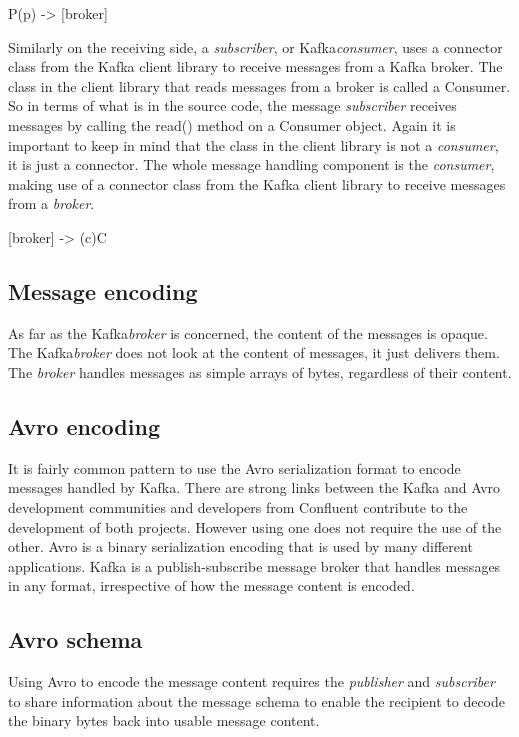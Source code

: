 \documentclass{article}
\newcommand{\avro} {Avro\xspace}
\newcommand{\kafka} {Kafka\xspace}
\newcommand{\kfbroker} {\textit{broker}\xspace}
\newcommand{\kfconsumer} {\textit{consumer}\xspace}
\newcommand{\kfpublisher} {\textit{publisher}\xspace}
\newcommand{\kfsubscriber} {\textit{subscriber}\xspace}
\newcommand{\confluent} {Confluent\xspace}
\newcommand{\javaname}[1] {{\ttfamily\color{codeblue} #1}}
\begin{document}
   {P(p)} -> [broker]

Similarly on the receiving side, a \kfsubscriber, or \kafka \kfconsumer, uses a connector class from the \kafka client library to receive messages from a \kafka broker.
The class in the client library that reads messages from a broker is called a \javaname{Consumer}. So in terms of what is in the source code, the message \kfsubscriber receives messages by calling the \javaname{read()} method on a \javaname{Consumer} object.
Again it is important to keep in mind that the class in the client library is not a \kfconsumer, it is just a connector. The whole message handling component is the \kfconsumer, making use of a connector class from the \kafka client library to receive messages from a \kfbroker.

   [broker] -> {(c)C}

\subsection{Message encoding}
\label{kafka-encoding}

As far as the \kafka \kfbroker is concerned, the content of the messages is opaque. The \kafka \kfbroker does not look at the content of messages, it just delivers them.
The \kfbroker handles messages as simple arrays of bytes, regardless of their content.

\subsection{Avro encoding}
\label{avro-encoding}

It is fairly common pattern to use the 
\avro serialization format to encode messages handled by \kafka.
There are strong links between the \kafka and \avro development 
communities and developers from \confluent contribute to the development of both projects.
However using one does not require the use of the other.
\avro is a binary serialization encoding that is used by many different applications.
\kafka is a publish-subscribe message broker that handles messages in any format, irrespective of how the message content is encoded.

\subsection{Avro schema}
\label{avro-schema}

Using \avro to encode the message content requires the \kfpublisher and \kfsubscriber to share information about the message schema to enable the recipient to decode the binary bytes back into usable message content.
\end{document}
